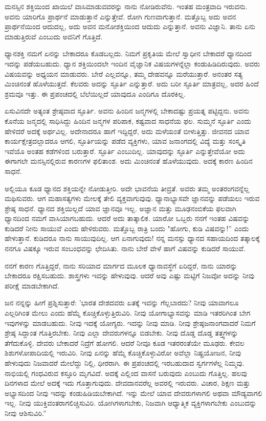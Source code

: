 ಮನಸ್ಸಿನ ಶಕ್ತಿಯಿಂದ ಖಾಯಿಲೆ ವಾಸಿಮಾಡುವವರನ್ನು ನಾನು ನೋಡಿರುವೆನು. ಇಂತಹ ಮಂತ್ರವಾದಿ ಇರುವನು. ಅವನು ಯಾರಿಗೊ ಪ್ರಾರ್ಥನೆ ಮಾಡುತ್ತಾನೆ ಎನ್ನುತ್ತೇವೆ. ರೋಗಿ ಗುಣವಾಗುತ್ತಾನೆ. ಮತ್ತೊಬ್ಬ ಅದು ಅವನ ಪ್ರಾರ್ಥನೆಯಿಂದ ಆದುದಲ್ಲ, ಅದು ಅವನ ಮನೋಶಕ್ತಿಯಿಂದ ಆದುದು ಎನ್ನುತ್ತಾನೆ. ಅವನು ವಿಜ್ಞಾನಿ. ತಾನು ಏನು ಮಾಡುತ್ತಿರುವೆ ಎಂಬುದು ಅವನಿಗೆ ಗೊತ್ತಿದೆ.

\newpage

ಧ್ಯಾನಶಕ್ತಿ ನಮಗೆ ಏನನ್ನು ಬೇಕಾದರೂ ಕೊಡಬಲ್ಲದು. ನಿಮಗೆ ಪ್ರಕೃತಿಯ ಮೇಲೆ ಸ್ವಾಧೀನ ಬೇಕಾದರೆ ಧ್ಯಾನದಿಂದ ಇದನ್ನು ಪಡೆಯಬಹುದು. ಧ್ಯಾನ ಶಕ್ತಿಯಿಂದಲೇ ಇಂದಿನ ವೈಜ್ಞಾನಿಕ ವಿಷಯಗಳನ್ನೆಲ್ಲಾ ಕಂಡುಹಿಡಿದಿರುವುದು. ಅವರು ವಿಷಯವನ್ನು ಅಧ್ಯಯನ ಮಾಡುವರು. ಬೇರೆ ಎಲ್ಲವನ್ನೂ, ತಮ್ಮ ದೇಹವನ್ನೂ ಮರೆಯುತ್ತಾರೆ. ಅನಂತರ ಸತ್ಯ ಮಿಂಚಿನಂತೆ ಹೊಳೆಯುತ್ತದೆ. ಕೆಲವರು ಅದನ್ನು ಸ್ಫೂರ್ತಿ ಎನ್ನುತ್ತಾರೆ. ಅದು ಬರೀ ಸ್ಫೂರ್ತಿ ಮಾತ್ರವಲ್ಲ, ಅದರ ಹಿಂದೆ ಶ್ರಮವೂ ಇತ್ತು. ಈ ಪ್ರಪಂಚದಲ್ಲಿ ಬೆಲೆಯಿಲ್ಲದೆ ಯಾವುದೂ ಎಂದಿಗೂ ದೊರಕಿಲ್ಲ.

ಏಸುವಿನದೇ ಅತ್ಯಂತ ಶ್ರೇಷ್ಠವಾದ ಸ್ಫೂರ್ತಿ. ಅವನು ಹಿಂದಿನ ಜನ್ಮಗಳಲ್ಲಿ ಬೇಕಾದಷ್ಟು ಪ್ರಯತ್ನ ಪಟ್ಟಿದ್ದನು. ಅವನು ಕೊನೆಯ ಜನ್ಮದಲ್ಲಿ ಸಾಧಿಸಿದ್ದು ಹಿಂದಿನ ಜನ್ಮಗಳ ಪರಿಪಾಕ, ಕಷ್ಟವಾದ ಸಾಧನೆಯ ಫಲ. ಸುಮ್ಮನೆ ಸ್ಫೂರ್ತಿ ಎಂದು ಹೇಳಿದರೆ ಅದಕ್ಕೆ ಅರ್ಥವಿಲ್ಲ. ಅದೇನಾದರೂ ಹಾಗೆ ಇದ್ದಿದ್ದರೆ, ಅದು ಮಳೆಯಂತೆ ಬೀಳುತ್ತಿತ್ತು. ಜೀವನದ ಯಾವ ಕಾರ್ಯಕ್ಷೇತ್ರದಲ್ಲಾದರೂ ಆಗಲಿ, ಸ್ಫೂರ್ತಿಯನ್ನು ಪಡೆದ ವ್ಯಕ್ತಿಗಳು, ಯಾವ ಜನಾಂಗದಲ್ಲಿ ವಿದ್ಯೆ ಮತ್ತು ಸಂಸ್ಕೃತಿ ಇವೆಯೊ ಅಂತಹ ಕಡೆಗಳಿಂದ ಬರುತ್ತಾರೆ. ಸ್ಫೂರ್ತಿ ಎಂಬುದಿಲ್ಲ. ಯಾವುದನ್ನು ಸ್ಫೂರ್ತಿ ಎನ್ನುತ್ತೇವೆಯೋ ಅದು ಈಗಾಗಲೇ ಮನಸ್ಸಿನಲ್ಲಿರುವ ಕಾರಣಗಳ ಫಲಿತಾಂಶ. ಅದು ಮಿಂಚಿನಂತೆ ಹೊಳೆಯುವುದು. ಅದಕ್ಕೆ ಕಾರಣ ಹಿಂದಿನ ಸಾಧನೆ.

ಅಲ್ಲಿಯೂ ಕೂಡ ಧ್ಯಾನದ ಶಕ್ತಿಯನ್ನೇ ನೋಡುತ್ತೀರಿ. ಅದೇ ಭಾವನೆಯ ತೀವ್ರತೆ. ಅವರು ತಮ್ಮ ಅಂತರಂಗವನ್ನೆಲ್ಲ ಮಥಿಸುವರು. ಆಗ ಮಹಾಸತ್ಯಗಳು ಮೇಲಕ್ಕೆ ತೇಲಿ ವ್ಯಕ್ತವಾಗುವುವು. ಧ್ಯಾನಾಭ್ಯಾಸವೇ ಜ್ಞಾನವನ್ನು ಪಡೆಯಲು ಇರುವ ಶ್ರೇಷ್ಠ ಸಾಧನೆ. ಧ್ಯಾನದ ಶಕ್ತಿಯಿಲ್ಲದೆ ಯಾವ ಜ್ಞಾನವೂ ಇಲ್ಲ. ಅಜ್ಞಾನ ಮತ್ತು ಮೂಢನಂಬಿಕೆಯ ಫಲವಾಗಿ ಧ್ಯಾನದಿಂದ ನಮಗೆ ವಾಸಿಯಾಗಬಹುದು. ಆದರೆ ಅದು ತಾತ್ಕಾಲಿಕ. ಯಾರೋ ಒಬ್ಬರು ನನಗೆ ಇಂತಹ ವಿಷವನ್ನು ಕುಡಿದರೆ ನೀನು ಸಾಯುವೆ ಎಂದು ಹೇಳಿರುವರು. ಮತ್ತೊಬ್ಬ ರಾತ್ರಿ ಬಂದು "ಹೋಗು, ಕುಡಿ ವಿಷವನ್ನು!'' ಎಂದು ಹೇಳುತ್ತಾನೆ. ಕುಡಿದರೂ ನಾನು ಸಾಯುವುದಿಲ್ಲ. ಆಗ ಏನಾಗುವುದು! ನನ್ನ ಮನಸ್ಸು ಧ್ಯಾನದ ಸಹಾಯದಿಂದ ತತ್ಕಾಲಕ್ಕೆ ನನಗೂ ವಿಷಕ್ಕೂ ಇರುವ ಸಂಬಂಧವನ್ನು ಛೇದಿಸಿತು. ನಾನು ಬೇರೆ ವೇಳೆ ಹಾಗೆ ವಿಷವನ್ನು ಕುಡಿದರೆ ಸಾಯುವೆ.

ನನಗೆ ಕಾರಣ ಗೊತ್ತಿದ್ದರೆ, ನಾನು ಸರಿಯಾದ ಮಾರ್ಗದ ಮೂಲಕ ಧ್ಯಾನಾವಸ್ಥೆಗೆ ಏರಿದ್ದರೆ, ನಾನು ಯಾರನ್ನು ಬೇಕಾದರೂ ರಕ್ಷಿಸಬಹುದು. ಶಾಸ್ತ್ರಗಳು ಇವನ್ನು ಹೇಳುವುವು. ಆದರೆ ಅವು ಎಷ್ಟು ಮಟ್ಟಿಗೆ ನಿಜವೋ ಅದನ್ನು ನೀವು ಪರೀಕ್ಷೆ ಮಾಡಬೇಕಾಗಿದೆ.

ಜನ ನನ್ನನ್ನು ಹೀಗೆ ಪ್ರಶ್ನಿಸುತ್ತಾರೆ: 'ಭಾರತ ದೇಶದವರು ಏತಕ್ಕೆ ಇವನ್ನು ಗೆಲ್ಲಬಾರದು? ನೀವು ಯಾವಾಗಲೂ ಎಲ್ಲರಿಗಿಂತ ಮೇಲು ಎಂದು ಹೆಮ್ಮೆ ಕೊಚ್ಚಿಕೊಳ್ಳುತ್ತಿರುವಿರಿ. ನೀವು ಯೋಗಾಭ್ಯಾಸವನ್ನು ಮಾಡಿ ಇತರರಿಗಿಂತ ಬೇಗ ಇವುಗಳನ್ನು ಮಾಡಬಹುದು. ನೀವು ಇದಕ್ಕೆ ಯೋಗ್ಯರು. ಇದನ್ನು ನೀವು ಮಾಡಿ. ನೀವು ಶ್ರೇಷ್ಠ\break ಜನಾಂಗವಾದರೆ ನಿಮಗೆ ಶ್ರೇಷ್ಠ ಸಿದ್ದಾಂತ ಗೊತ್ತಿರಬೇಕು. ನೀವು ಎಲ್ಲಾ ದೇವರುಗಳನ್ನೂ ಬಿಡಬೇಕು. ನೀವು ದೊಡ್ಡ ದೊಡ್ಡ ತತ್ತ್ವಗಳನ್ನು ತೆಗೆದುಕೊಳ್ಳಿ. ದೇವರು ಬೇಕಾದರೆ ನಿದ್ರೆಗೆ ಹೋಗಲಿ. ಆದರೆ ನೀವೂ ಕೂಡ ಇತರರಂತೆಯೇ ಮೂಢರು. ಕೇವಲ ಶಿಶುಗಳೋಪಾದಿಯಲ್ಲಿ ಇರುವಿರಿ. ನೀವು ಏನನ್ನು ಹೆಮ್ಮೆ ಕೊಚ್ಚಿಕೊಳ್ಳುವಿರೋ ಅವೆಲ್ಲಾ ನಿಷ್ಪ್ರಯೋಜನ, ನೀವು ಹೇಳುವುದು ನಿಜವಾದರೆ ಮೇಲೆದ್ದು ನಿಲ್ಲಿ, ಧೀರರಾಗಿ. ಈ ಪ್ರಪಂಚದಲ್ಲಿ ಇರಬಹುದಾದ ಸ್ವರ್ಗಗಳೆಲ್ಲ ನಿಮ್ಮವು. ನಾಭಿಯಲ್ಲಿ ಗಂಧವಿರುವ ಕಸ್ತೂರಿ ಮೃಗವಿದೆ. ಅದಕ್ಕೆ ಎಲ್ಲಿಂದ ವಾಸನೆ ಬರುವುದು ಎಂಬುದು ಗೊತ್ತಿಲ್ಲ. ಹಲವು ದಿನಗಳಾದ ಮೇಲೆ ಅದಕ್ಕೆ ಇದು ಗೊತ್ತಾಗುವುದು. ದೇವದಾನವರೆಲ್ಲ ಅವರಲ್ಲಿ ಇರುವರು. ವಿಚಾರ, ಶಿಕ್ಷಣ ಮತ್ತು ಅಭ್ಯಾಸದಿಂದ ನೀವು ಇದನ್ನು ಕಂಡುಹಿಡಿಯಬೇಕಾಗಿದೆ. ಇನ್ನು ಮೇಲೆ ಯಾವ ದೇವರುಗಳಾಗಲಿ ಅಥವಾ ಮೌಡ್ಯವಾಗಲಿ ಇಲ್ಲ. ನೀವು ಯುಕ್ತಿವಂತರಾಗಲಿಚ್ಚಿಸುವಿರಿ. ಯೋಗಿಗಳಾಗಬೇಕು, ನಿಜವಾಗಿ ಆಧ್ಯಾತ್ಮಿಕ ವ್ಯಕ್ತಿಗಳಾಗಬೇಕು ಎಂಬುದನ್ನು ನೀವು ಆಶಿಸುವಿರಿ.”

